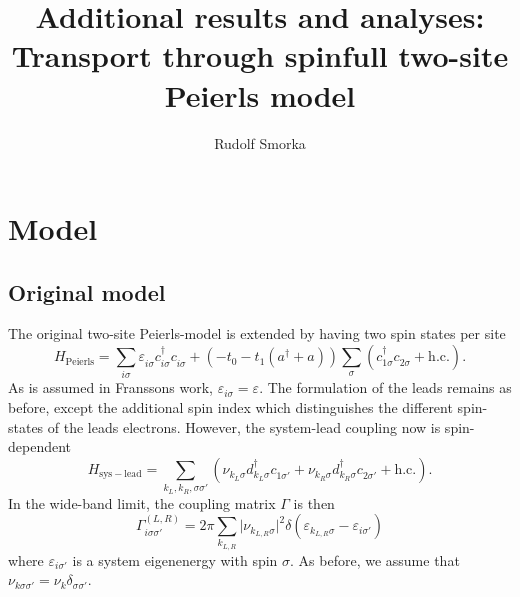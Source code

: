 \documentclass{article}
\newcommand{\pdagger}{{\phantom{\dagger}}}
\begin{document}
\title{Additional results and analyses: Transport through spinfull two-site Peierls model}
\author{Rudolf Smorka}
\maketitle
\section{Model}
\subsection{Original model}
The original two-site Peierls-model is extended by having two spin states per site
\begin{equation}
	H_\mathrm{Peierls} = \sum_{i\sigma}\varepsilon_{i\sigma}^\pdagger c_{i\sigma}^\dagger c_{i\sigma}^\pdagger + (-t_0-t_1(a^\dagger + a))\sum_\sigma (c_{1\sigma}^\dagger c_{2\sigma}^\pdagger + \mathrm{h.c.}).
\end{equation}
As is assumed in Franssons work, $\varepsilon_{i\sigma}=\varepsilon$. The formulation of the leads remains as before, except the additional spin index which distinguishes the different spin-states of the leads electrons. However, the system-lead coupling now is spin-dependent
\begin{equation}
	H_\mathrm{sys-lead} = \sum_{k_L,k_R,\sigma\sigma'} (\nu_{k_L\sigma }^\pdagger d_{k_L\sigma}^\dagger c_{1\sigma'}^\pdagger + \nu_{k_R\sigma }^\pdagger d_{k_R\sigma}^\dagger  c_{2\sigma'}^\pdagger + \mathrm{h.c.}).
\end{equation}
In the wide-band limit, the coupling matrix $\Gamma$ is then
\begin{equation}
	\Gamma_{i \sigma\sigma'}^{(L,R)} = 2\pi \sum_{k_{L,R}} \vert \nu_{k_{L,R} \sigma}\vert^2 \delta(\varepsilon_{k_{L,R}\sigma}-\varepsilon_{i\sigma'})
\end{equation}
where $\varepsilon_{i\sigma'}$ is a system eigenenergy with spin $\sigma$. As before, we assume that $\nu_{k\sigma\sigma'} = \nu_k \delta_{\sigma\sigma'}$. 
\end{document}
